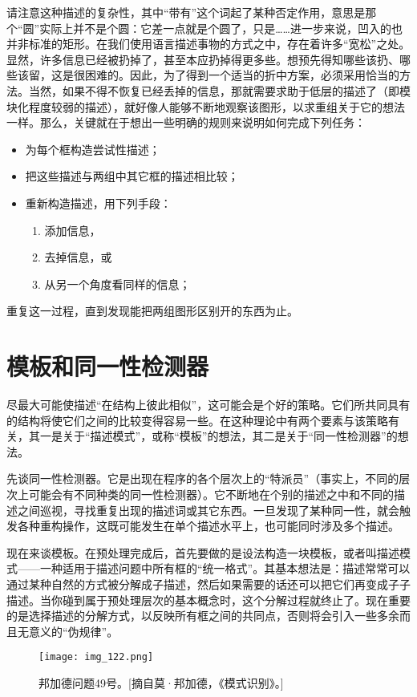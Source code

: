 请注意这种描述的复杂性，其中“带有”这个词起了某种否定作用，意思是那个“圆”实际上并不是个圆：它差一点就是个圆了，只是……进一步来说，凹入的也并非标准的矩形。在我们使用语言描述事物的方式之中，存在着许多“宽松”之处。显然，许多信息已经被扔掉了，甚至本应扔掉得更多些。想预先得知哪些该扔、哪些该留，这是很困难的。因此，为了得到一个适当的折中方案，必须采用恰当的方法。当然，如果不得不恢复已经丢掉的信息，那就需要求助于低层的描述了（即模块化程度较弱的描述），就好像人能够不断地观察该图形，以求重组关于它的想法一样。那么，关键就在于想出一些明确的规则来说明如何完成下列任务：
\begin{itemize}
\item 为每个框构造尝试性描述；
\item 把这些描述与两组中其它框的描述相比较；
\item 重新构造描述，用下列手段：
\begin{enumerate}[labelindent=0pt,label=(\roman*)]
  \item 添加信息，
  \item 去掉信息，或
  \item 从另一个角度看同样的信息；
\end{enumerate}
\end{itemize}
重复这一过程，直到发现能把两组图形区别开的东西为止。

\section{模板和同一性检测器}

尽最大可能使描述“在结构上彼此相似”，这可能会是个好的策略。它们所共同具有的结构将使它们之间的比较变得容易一些。在这种理论中有两个要素与该策略有关，其一是关于“描述模式”，或称“模板”的想法，其二是关于“同一性检测器”的想法。

先谈同一性检测器。它是出现在程序的各个层次上的“特派员”（事实上，不同的层次上可能会有不同种类的同一性检测器）。它不断地在个别的描述之中和不同的描述之间巡视，寻找重复出现的描述词或其它东西。一旦发现了某种同一性，就会触发各种重构操作，这既可能发生在单个描述水平上，也可能同时涉及多个描述。

现在来谈模板。在预处理完成后，首先要做的是设法构造一块模板，或者叫描述模式——一种适用于描述问题中所有框的“统一格式”。其基本想法是：描述常常可以通过某种自然的方式被分解成子描述，然后如果需要的话还可以把它们再变成子子描述。当你碰到属于预处理层次的基本概念时，这个分解过程就终止了。现在重要的是选择描述的分解方式，以反映所有框之间的共同点，否则将会引入一些多余而且无意义的“伪规律”。

\begin{figure}
\texttt{[image: img\_122.png]}
\caption[邦加德问题49号。]
  {邦加德问题49号。[摘自莫·邦加德，《模式识别》。] }
\end{figure}

